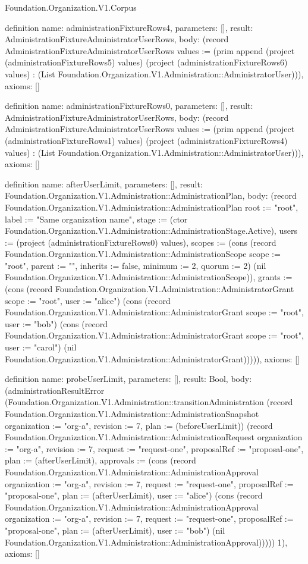 \begin{lexlean}{Foundation.Organization.V1.Corpus}
\begin{semanticmodule}
definition{
  name: administrationFixtureRows4,
  parameters: [],
  result: AdministrationFixtureAdministratorUserRows,
  body: (record AdministrationFixtureAdministratorUserRows {values := (prim append (project (administrationFixtureRows5) values) (project (administrationFixtureRows6) values) : (List Foundation.Organization.V1.Administration::AdministratorUser))}),
  axioms: []
}

definition{
  name: administrationFixtureRows0,
  parameters: [],
  result: AdministrationFixtureAdministratorUserRows,
  body: (record AdministrationFixtureAdministratorUserRows {values := (prim append (project (administrationFixtureRows1) values) (project (administrationFixtureRows4) values) : (List Foundation.Organization.V1.Administration::AdministratorUser))}),
  axioms: []
}

definition{
  name: afterUserLimit,
  parameters: [],
  result: Foundation.Organization.V1.Administration::AdministrationPlan,
  body: (record Foundation.Organization.V1.Administration::AdministrationPlan {root := "root", label := "Same organization name", stage := (ctor Foundation.Organization.V1.Administration::AdministrationStage.Active), users := (project (administrationFixtureRows0) values), scopes := (cons (record Foundation.Organization.V1.Administration::AdministrationScope {scope := "root", parent := "", inherits := false, minimum := 2, quorum := 2}) (nil Foundation.Organization.V1.Administration::AdministrationScope)), grants := (cons (record Foundation.Organization.V1.Administration::AdministratorGrant {scope := "root", user := "alice"}) (cons (record Foundation.Organization.V1.Administration::AdministratorGrant {scope := "root", user := "bob"}) (cons (record Foundation.Organization.V1.Administration::AdministratorGrant {scope := "root", user := "carol"}) (nil Foundation.Organization.V1.Administration::AdministratorGrant))))}),
  axioms: []
}

definition{
  name: probeUserLimit,
  parameters: [],
  result: Bool,
  body: (administrationResultError (Foundation.Organization.V1.Administration::transitionAdministration (record Foundation.Organization.V1.Administration::AdministrationSnapshot {organization := "org-a", revision := 7, plan := (beforeUserLimit)}) (record Foundation.Organization.V1.Administration::AdministrationRequest {organization := "org-a", revision := 7, request := "request-one", proposalRef := "proposal-one", plan := (afterUserLimit), approvals := (cons (record Foundation.Organization.V1.Administration::AdministrationApproval {organization := "org-a", revision := 7, request := "request-one", proposalRef := "proposal-one", plan := (afterUserLimit), user := "alice"}) (cons (record Foundation.Organization.V1.Administration::AdministrationApproval {organization := "org-a", revision := 7, request := "request-one", proposalRef := "proposal-one", plan := (afterUserLimit), user := "bob"}) (nil Foundation.Organization.V1.Administration::AdministrationApproval)))})) 1),
  axioms: []
}


\end{semanticmodule}
\end{lexlean}
